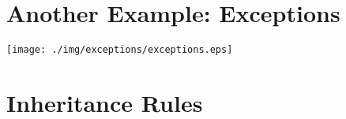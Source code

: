 \documentclass[a4paper, 9pt]{extarticle}
\begin{document}
\section{Another Example: Exceptions}

\begin{center}
  \texttt{[image: ./img/exceptions/exceptions.eps]}
\end{center}













\section{Inheritance Rules}
\end{document}
